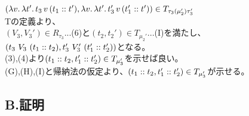 $(\lambda{v}.\,{\lambda{t'}.\,{t_3\,v\,(t_1::t')}}, \lambda{v}.\,{\lambda{t'}.\,{t_3'\,v\,(t_1'::t')}})\in T_{\tau_3(\mu_2')\tau_3'}$\\
Tの定義より、\\
$(V_3,V_3')\in R_{\tau_3}$...(6)と$(t_2,t_2')\in T_{\mu_2'}$...(I)を満たし、$(t_3\ V_3\ (\Cons{t_1}{t_2}),t_3'\ V_3'\ (\Cons{t_1'}{t_2'}))$となる。\\
(3),(4)より$(t_1::t_2,t_1'::t_2')\in T_{\mu_3'}$を示せば良い。\\
(G),(H),(I)と帰納法の仮定より、$(t_1::t_2,t_1'::t_2')\in T_{\mu_3'}$が示せる。
\\


\subsection*{B.証明}

